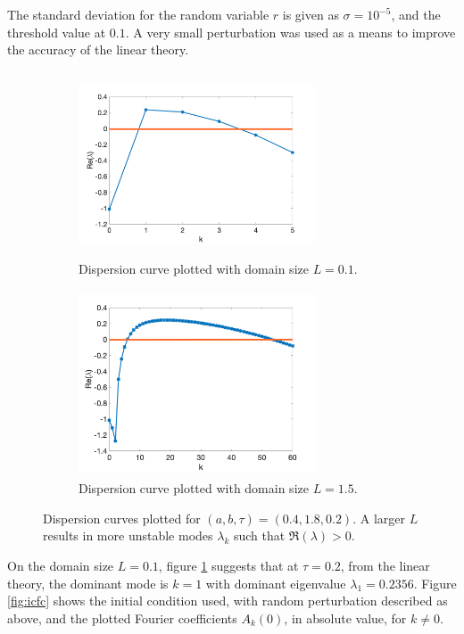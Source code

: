 The standard deviation for the random variable $r$ is given as $\sigma=10^{-5}$, and the threshold value at $0.1$. A very small perturbation was used as a means to improve the accuracy of the linear theory.
\begin{figure}[H]
    \centering
    \begin{subfigure}[b]{0.45\textwidth}
        \centering
        \includegraphics[width=7cm,height=5.5cm]{compdisp1.png}
        \caption{Dispersion curve plotted with domain size $L=0.1$.}
        \label{fig:compdisp1}
    \end{subfigure}
    \hfill
    \begin{subfigure}[b]{0.45\textwidth}
        \centering
        \includegraphics[width=7cm,height=5.5cm]{compdisp2.png}
        \caption{Dispersion curve plotted with domain size $L=1.5$.}
        \label{fig:compdisp2}
    \end{subfigure}
    \caption{Dispersion curves plotted for $(a,b,\tau)=(0.4,1.8,0.2)$. A larger $L$ results in more unstable modes $\lambda_k$ such that $\Re(\lambda)>0$. }
    \label{fig:compardisp}
\end{figure}
On the domain size $L=0.1$, figure \ref{fig:compdisp1} suggests that at $\tau=0.2$, from the linear theory, the dominant mode is $k=1$ with dominant eigenvalue $\lambda_1=0.2356$. Figure \ref{fig:icfc} shows the initial condition used, with random perturbation described as above, and the plotted Fourier coefficients $A_k(0)$, in absolute value, for $k\neq0$.
